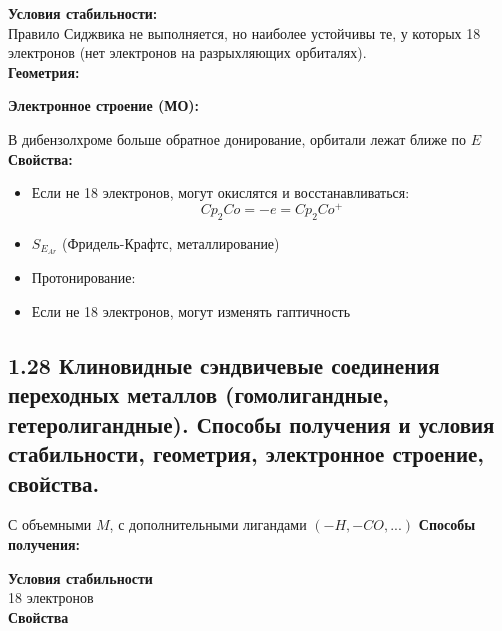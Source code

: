 \textbf{Условия стабильности:}\\
Правило Сиджвика не выполняется, но наиболее устойчивы те, у которых 18 электронов (нет электронов на разрыхляющих орбиталях). \\
\textbf{Геометрия:}\\
\begin{figure} [H]
	\centering {\texttt{[image: xx4]}}
\end{figure}
\textbf{Электронное строение (МО):}\\
\begin{figure} [H]
	\centering {\texttt{[image: xx5]}}
\end{figure}
В дибензолхроме больше обратное донирование, орбитали лежат ближе по $E$ 
\textbf{Свойства:}\\
\begin{itemize}
	\item Если не 18 электронов, могут окислятся и восстанавливаться:
	\[
	Cp_2Co = -e = Cp_2Co^{+}
	\]
	\item $S_{E_{Ar}}$ (Фридель-Крафтс, металлирование)
	\item Протонирование:
	\begin{figure} [H]
		\centering {\texttt{[image: xx6]}}
	\end{figure}
	\item Если не 18 электронов, могут изменять гаптичность
\end{itemize}


\subsection{1.28 Клиновидные сэндвичевые соединения переходных металлов (гомолигандные, гетеролигандные). Способы получения и условия стабильности, геометрия, электронное строение, свойства.}
\begin{figure} [H]
	\centering {\texttt{[image: ss1]}}
\end{figure}
С объемными $M$, с дополнительными лигандами $(-H, -CO, ...)$
\textbf{Способы получения:}\\
\begin{figure} [H]
	\centering {\texttt{[image: ss2]}}
\end{figure}
\textbf{Условия стабильности}\\
18 электронов \\
\textbf{Свойства}\\
\begin{figure} [H]
	\centering {\texttt{[image: ss3]}}
\end{figure}

